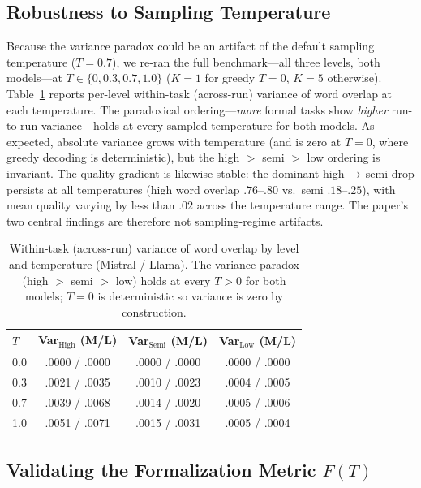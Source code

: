 \documentclass[runningheads]{llncs}
\begin{document}
\subsection{Robustness to Sampling Temperature}
\label{sec:temp-robustness}

Because the variance paradox could be an artifact of the default sampling temperature ($T\!=\!0.7$), we re-ran the full benchmark---all three levels, both models---at $T \in \{0, 0.3, 0.7, 1.0\}$ ($K\!=\!1$ for greedy $T\!=\!0$, $K\!=\!5$ otherwise). Table~\ref{tab:temp-sweep} reports per-level within-task (across-run) variance of word overlap at each temperature. The paradoxical ordering---\emph{more} formal tasks show \emph{higher} run-to-run variance---holds at every sampled temperature for both models. As expected, absolute variance grows with temperature (and is zero at $T\!=\!0$, where greedy decoding is deterministic), but the high $>$ semi $>$ low ordering is invariant. The quality gradient is likewise stable: the dominant high$\,\to\,$semi drop persists at all temperatures (high word overlap $.76$--$.80$ vs.\ semi $.18$--$.25$), with mean quality varying by less than $.02$ across the temperature range. The paper's two central findings are therefore not sampling-regime artifacts.

\begin{table}[htbp]
\centering
\caption{Within-task (across-run) variance of word overlap by level and temperature (Mistral / Llama). The variance paradox (high $>$ semi $>$ low) holds at every $T>0$ for both models; $T\!=\!0$ is deterministic so variance is zero by construction.}
\label{tab:temp-sweep}
\setlength{\tabcolsep}{6pt}
\begin{tabular}{lccc}
\toprule
$T$ & Var$_{\text{High}}$ (M/L) & Var$_{\text{Semi}}$ (M/L) & Var$_{\text{Low}}$ (M/L) \\
\midrule
0.0 & .0000 / .0000 & .0000 / .0000 & .0000 / .0000 \\
0.3 & .0021 / .0035 & .0010 / .0023 & .0004 / .0005 \\
0.7 & .0039 / .0068 & .0014 / .0020 & .0005 / .0006 \\
1.0 & .0051 / .0071 & .0015 / .0031 & .0005 / .0004 \\
\bottomrule
\end{tabular}
\end{table}

\subsection{Validating the Formalization Metric $F(T)$}
\label{sec:F-validation}
\end{document}
